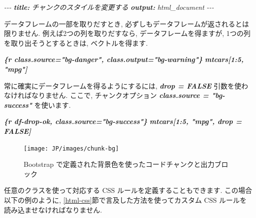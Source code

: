 \documentclass[
  11pt,
  lualatex,ja=standard,jafont=noto]{bxjsreport}
\newenvironment{Shaded}{\begin{snugshade}}{\end{snugshade}}
\newcommand{\AnnotationTok}[1]{\textcolor[rgb]{0.56,0.35,0.01}{\textbf{\textit{#1}}}}
\newcommand{\CommentTok}[1]{\textcolor[rgb]{0.56,0.35,0.01}{\textit{#1}}}
\newcommand{\InformationTok}[1]{\textcolor[rgb]{0.56,0.35,0.01}{\textbf{\textit{#1}}}}
\newcommand{\NormalTok}[1]{#1}
\begin{document}
\begin{Shaded}
\begin{Highlighting}[]
\CommentTok{{-}{-}{-}}
\AnnotationTok{title:}\CommentTok{ チャンクのスタイルを変更する}
\AnnotationTok{output:}\CommentTok{ html\_document}
\CommentTok{{-}{-}{-}}

\NormalTok{データフレームの一部を取りだすとき, 必ずしもデータフレームが返されるとは限りません. 例えば2つの列を取りだすなら, データフレームを得ますが, 1つの列を取り出そうとするときは, ベクトルを得ます.}

\InformationTok{\textasciigrave{}\textasciigrave{}\textasciigrave{}\{r class.source="bg{-}danger", class.output="bg{-}warning"\}}
\InformationTok{mtcars[1:5, "mpg"]}
\InformationTok{\textasciigrave{}\textasciigrave{}\textasciigrave{}}

\NormalTok{常に確実にデータフレームを得るようにするには, }\InformationTok{\textasciigrave{}drop = FALSE\textasciigrave{}}\NormalTok{ 引数を使わなければなりません. ここで, チャンクオプション }\InformationTok{\textasciigrave{}class.source = "bg{-}success"\textasciigrave{}}\NormalTok{ を使います.}

\InformationTok{\textasciigrave{}\textasciigrave{}\textasciigrave{}\{r df{-}drop{-}ok, class.source="bg{-}success"\}}
\InformationTok{mtcars[1:5, "mpg", drop = FALSE]}
\InformationTok{\textasciigrave{}\textasciigrave{}\textasciigrave{}}
\end{Highlighting}
\end{Shaded}

\begin{figure}

{\centering \texttt{[image: JP/images/chunk-bg]} 

}

\caption{Bootstrap で定義された背景色を使ったコードチャンクと出力ブロック}\label{fig:chunk-bg}
\end{figure}

任意のクラスを使って対応する CSS ルールを定義することもできます. この場合以下の例のように, \ref{html-css}節で言及した方法を使ってカスタム CSS ルールを読み込ませなければなりません.
\end{document}
